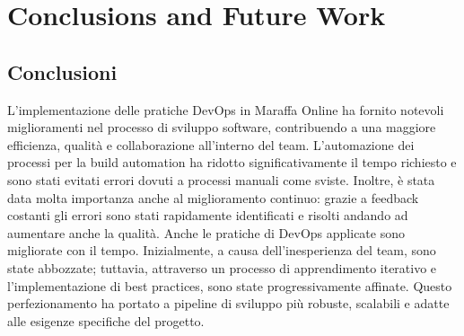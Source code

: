 \chapter{Conclusions and Future Work}
\label{ch:con}
\section{Conclusioni}
L'implementazione delle pratiche DevOps in Maraffa Online ha fornito notevoli miglioramenti nel processo di sviluppo
 software, contribuendo a una maggiore efficienza, qualità e collaborazione all'interno del team.
L'automazione dei processi per la build automation ha ridotto significativamente il tempo richiesto e sono stati evitati
errori dovuti a processi manuali come sviste.
Inoltre, è stata data molta importanza anche al miglioramento continuo: grazie a feedback costanti gli errori sono stati 
rapidamente identificati e risolti andando ad aumentare anche la qualità.
Anche le pratiche di DevOps applicate sono migliorate con il tempo. Inizialmente, a causa dell'inesperienza del team,
 sono state abbozzate; tuttavia, attraverso un processo di apprendimento iterativo e l'implementazione di best practices,
  sono state progressivamente affinate.
  Questo perfezionamento ha portato a pipeline di sviluppo più robuste, scalabili e adatte alle esigenze specifiche del progetto. 
